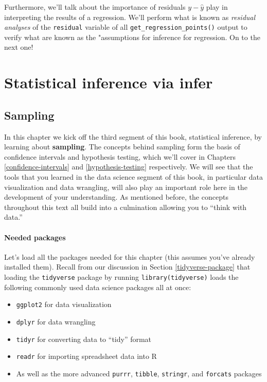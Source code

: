 \documentclass[12pt, krantz2,]{krantz}
\providecommand{\tightlist}{%
  \setlength{\itemsep}{0pt}\setlength{\parskip}{0pt}}
\begin{document}
Furthermore, we'll talk about the importance of residuals \(y - \widehat{y}\) play in interpreting the results of a regression. We'll perform what is known as \emph{residual analyses} of the \texttt{residual} variable of all \texttt{get\_regression\_points()} output to verify what are known as the "assumptions for inference for regression. On to the next one!

\hypertarget{part-statistical-inference-via-infer}{%
\part{Statistical inference via infer}\label{part-statistical-inference-via-infer}}

\hypertarget{sampling}{%
\chapter{Sampling}\label{sampling}}

In this chapter we kick off the third segment of this book, statistical inference, by learning about \textbf{sampling}. The concepts behind sampling form the basis of confidence intervals and hypothesis testing, which we'll cover in Chapters \ref{confidence-intervals} and \ref{hypothesis-testing} respectively. We will see that the tools that you learned in the data science segment of this book, in particular data visualization and data wrangling, will also play an important role here in the development of your understanding. As mentioned before, the concepts throughout this text all build into a culmination allowing you to ``think with data.''

\hypertarget{needed-packages-5}{%
\subsection*{Needed packages}\label{needed-packages-5}}


Let's load all the packages needed for this chapter (this assumes you've already installed them). Recall from our discussion in Section \ref{tidyverse-package} that loading the \texttt{tidyverse} package by running \texttt{library(tidyverse)} loads the following commonly used data science packages all at once:

\begin{itemize}
\tightlist
\item
  \texttt{ggplot2} for data visualization
\item
  \texttt{dplyr} for data wrangling
\item
  \texttt{tidyr} for converting data to ``tidy'' format
\item
  \texttt{readr} for importing spreadsheet data into R
\item
  As well as the more advanced \texttt{purrr}, \texttt{tibble}, \texttt{stringr}, and \texttt{forcats} packages
\end{itemize}
\end{document}
